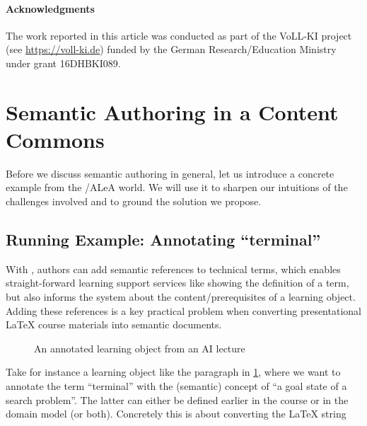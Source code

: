 \documentclass[runningheads]{llncs}
\newcommand\ALeA{\textsf{ALeA}\xspace}
\begin{document}
\paragraph{Acknowledgments}
The work reported in this article was conducted as part of the VoLL-KI project (see
\url{https://voll-ki.de}) funded by the German Research/Education Ministry under grant
16DHBKI089.

\section{Semantic Authoring in a Content Commons}\label{sec:semauth}

Before we discuss semantic authoring in general, let us introduce a concrete example from
the \sTeX/\ALeA world. We will use it to sharpen our intuitions of the challenges
involved and to ground the solution we propose.

\subsection{Running Example: Annotating ``terminal''}
With \sTeX, authors can add semantic references to technical terms,
which enables straight-forward learning support services like
showing the definition of a term, but also informs the system
about the content/prerequisites of a learning object.
Adding these references is a key practical problem when converting presentational {\LaTeX}
course materials into semantic documents.

\begin{figure}[ht]\centering
  \caption{An annotated learning object from an AI lecture}\label{fig:lo}
\end{figure}

Take for instance a learning object like the paragraph in \cref{fig:lo}, where we want to
annotate the term ``terminal'' with the (semantic) concept of ``a goal state of a search
problem''. The latter can either be defined earlier in the course or in the domain model
(or both). Concretely this is about converting the {\LaTeX} string
\end{document}
